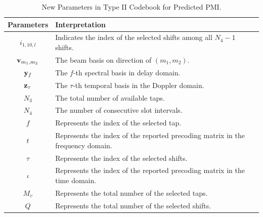\documentclass[lettersize,journal]{IEEEtran}
\begin{document}
\begin{table}[t]   
\begin{center} 
\centering  
\captionsetup{
  labelsep=newline, %
}
\renewcommand{\arraystretch}{1.5}  %
\caption{New Parameters in Type II Codebook for Predicted PMI.}  
\label{paraEtypeiiP} 
\begin{tabular}{|c|m{6cm}|}   
\hline   \textbf{Parameters} &\textbf{Interpretation} \\  
\hline   $i_{1,10,l}$ &  Indicates the index of the selected shifts among all $N_4-1$ shifts. \\
\hline   ${\bf{v}}_{{m_1},m_2}$ & The beam basis on direction of $({m_1},m_2).$ \\
\hline   ${\bf{y}}_{f}$ & The $f$-th spectral basis in delay domain.  \\
\hline   ${\bf{z}}_{\tau}$ & The $\tau$-th temporal basis in the Doppler domain.  \\
\hline   ${N_3}$ & The total number of available taps.\\
\hline   $N_4$ & The number of consecutive slot intervals. \\
\hline   $f$ & Represents the index of the selected tap.\\
\hline   $t$ & Represents the index of the reported precoding matrix in the frequency domain.\\
\hline   $\tau$ &   Represents the index of the selected shifts. \\
\hline   $\iota$ & Represents the index of the reported precoding matrix in the time domain.\\
\hline $M_v$ & Represents the total number of the selected taps.\\
\hline $Q$ & Represents the total number of the selected shifts.\\
\hline
\end{tabular}   
\end{center}   
\vspace{-12pt}
\end{table}
\end{document}
